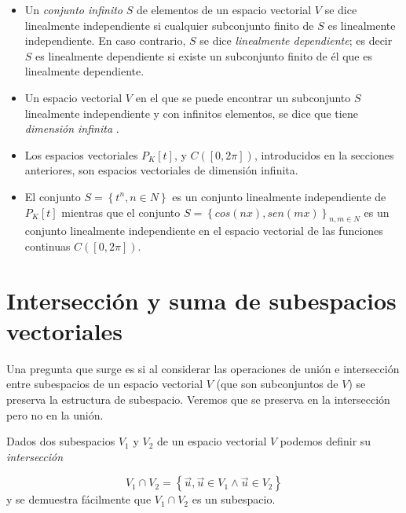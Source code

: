\begin{remark}
\begin{itemize}

\item 

\noindent
Un \textit{conjunto infinito} $S$ de elementos de un espacio vectorial $V$ se dice linealmente independiente si cualquier subconjunto finito de $S$ es linealmente independiente. En caso contrario, $S$ se dice \textit{linealmente dependiente}; es decir $S$ es linealmente dependiente si existe un subconjunto finito de él que es linealmente dependiente. 

\item 
\noindent
Un espacio vectorial $V$ en el que se puede encontrar un subconjunto $S$ linealmente independiente y con infinitos elementos, se dice que tiene \textit{dimensión infinita
}.

\item 
\noindent
Los espacios  vectoriales $P_K\left[t\right]$, y $C(\left[0,2\pi\right])$, introducidos en la secciones anteriores, son espacios vectoriales de dimensión infinita. 
\item 
\noindent
El conjunto $S=\left\{t^{n}, n\in N\right\}$ es un conjunto linealmente independiente de $P_K\left[t\right]$ mientras que  el conjunto $S=\left\{cos(nx), sen(mx)\right\}_{n,m\in N}$ es un conjunto linealmente independiente en el espacio vectorial de las funciones continuas $C(\left[0,2\pi\right])$.
\end{itemize}
\end{remark}






%
\section{Intersección y suma de subespacios vectoriales}
\label{intysumadesub}
Una pregunta que surge es si al considerar las operaciones de unión e intersección entre subespacios de un espacio vectorial $V$ (que son subconjuntos de $V$) se preserva la estructura de subespacio. Veremos que se preserva en la intersección pero no en la unión.

Dados dos subespacios $V_1$ y $V_2$ de un espacio vectorial $V$ podemos definir su \textit{intersección}

$$V_1\cap V_2=\left\{\vec{u},\vec{u}\in V_1 \wedge \vec{u}\in V_2\right\}$$
\noindent
y se demuestra fácilmente que $V_1\cap V_2$ es un subespacio.

